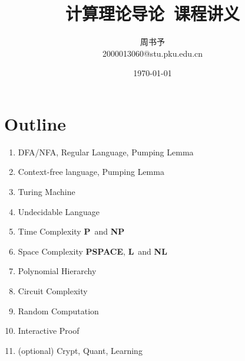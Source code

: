 \documentclass[8pt]{article}
\title{\heiti\zihao{1} 计算理论导论\ 课程讲义}
\author{\kaishu\zihao{-3} 周书予\\2000013060@stu.pku.edu.cn}
\date{\today}
\theoremstyle{compact}
\def\P{\textbf{P}}
\def\NP{\textbf{NP}}
\def\PSPACE{\textbf{PSPACE}}
\def\L{\textbf{L}}
\def\NL{\textbf{NL}}
\begin{document}
\pagestyle{fancy}


\maketitle

\section{Outline}
	\begin{enumerate}	
		\item DFA/NFA, Regular Language, Pumping Lemma
		\item Context-free language, Pumping Lemma
		\item Turing Machine
		\item Undecidable Language
		\item Time Complexity \P\ and \NP
		\item Space Complexity \PSPACE, \L\ and \NL
		\item Polynomial Hierarchy
		\item Circuit Complexity
		\item Random Computation
		\item Interactive Proof
		\item (optional) Crypt, Quant, Learning
	\end{enumerate}



\newpage
\end{document}

